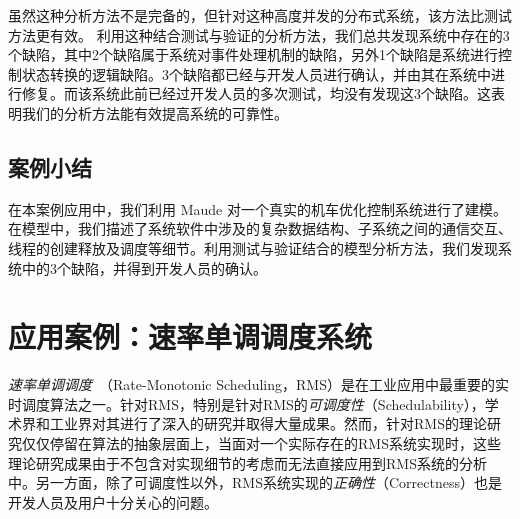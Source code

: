 虽然这种分析方法不是完备的，但针对这种高度并发的分布式系统，该方法比测试方法更有效。
利用这种结合测试与验证的分析方法，我们总共发现系统中存在的3个缺陷，其中2个缺陷属于系统对事件处理机制的缺陷，另外1个缺陷是系统进行控制状态转换的逻辑缺陷。3个缺陷都已经与开发人员进行确认，并由其在系统中进行修复。而该系统此前已经过开发人员的多次测试，均没有发现这3个缺陷。这表明我们的分析方法能有效提高系统的可靠性。


\subsection{案例小结}

在本案例应用中，我们利用 Maude 对一个真实的机车优化控制系统进行了建模。在模型中，我们描述了系统软件中涉及的复杂数据结构、子系统之间的通信交互、线程的创建释放及调度等细节。利用测试与验证结合的模型分析方法，我们发现系统中的3个缺陷，并得到开发人员的确认。

 
\section{应用案例：速率单调调度系统}
\label{s:RMS}

\hide{
\usepackage{graphicx}
\usepackage[noadjust]{cite}
\usepackage{picinpar}
\usepackage{amsmath}
\usepackage{stfloats}
\usepackage{url}
\usepackage{flushend}
\usepackage[latin1]{inputenc}
\usepackage{colortbl}
\usepackage{soul}
\usepackage{multirow}
\usepackage{pifont}
\usepackage{color}
\usepackage[hidelinks,bookmarks=false]{hyperref}
\usepackage{enumerate}
\usepackage{siunitx}
\usepackage{breakurl}
\usepackage{epstopdf}
\usepackage{pbox}
}


\hide{
\makeatletter
\def\verbatim{\small\@verbatim \frenchspacing\@vobeyspaces \@xverbatim}
\makeatother
}


\emph{速率单调调度}~\cite{DBLP:journals/jacm/LiuL73}（Rate-Monotonic Scheduling，RMS）是在工业应用中最重要的实时调度算法之一。针对RMS，特别是针对RMS的\emph{可调度性}（Schedulability），学术界和工业界对其进行了深入的研究并取得大量成果。然而，针对RMS的理论研究仅仅停留在算法的抽象层面上，当面对一个实际存在的RMS系统实现时，这些理论研究成果由于不包含对实现细节的考虑而无法直接应用到RMS系统的分析中。另一方面，除了可调度性以外，RMS系统实现的\emph{正确性}（Correctness）也是开发人员及用户十分关心的问题。


